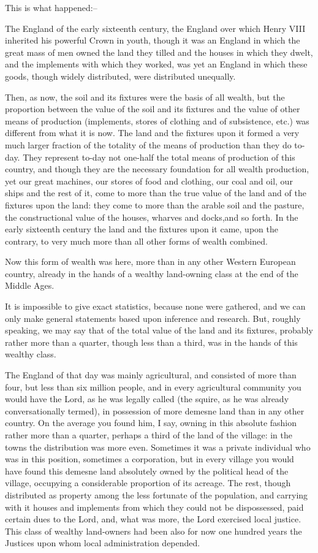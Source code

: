 \documentclass{book}
\begin{document}
This is what happened:–

The England of the early sixteenth century, the England over which Henry VIII inherited his powerful Crown in youth, though it was an England in which the great mass of men owned the land they tilled and the houses in which they dwelt, and the implements with which they worked, was yet an England in which these goods, though widely distributed, were distributed unequally.

Then, as now, the soil and its fixtures were the basis of all wealth, but the proportion between the value of the soil and its fixtures and the value of other means of production (implements, stores of clothing and of subsistence, etc.) was different from what it is now. The land and the fixtures upon it formed a very much larger fraction of the totality of the means of production than they do to-day. They represent to-day not one-half the total means of production of this country, and though they are the necessary foundation for all wealth production, yet our great machines, our stores of food and clothing, our coal and oil, our ships and the rest of it, come to more than the true value of the land and of the fixtures upon the land: they come to more than the arable soil and the pasture, the constructional value of the houses, wharves and docks,and so forth. In the early sixteenth century the land and the fixtures upon it came, upon the contrary, to very much more than all other forms of wealth combined.

Now this form of wealth was here, more than in any other Western European country, already in the hands of a wealthy land-owning class at the end of the Middle Ages.

It is impossible to give exact statistics, because none were gathered, and we can only make general statements based upon inference and research. But, roughly speaking, we may say that of the total value of the land and its fixtures, probably rather more than a quarter, though less than a third, was in the hands of this wealthy class.

The England of that day was mainly agricultural, and consisted of more than four, but less than six million people, and in every agricultural community you would have the Lord, as he was legally called (the squire, as he was already conversationally termed), in possession of more demesne land than in any other country. On the average you found him, I say, owning in this absolute fashion rather more than a quarter, perhaps a third of the land of the village: in the towns the distribution was more even. Sometimes it was a private individual who was in this position, sometimes a corporation, but in every village you would have found this demesne land absolutely owned by the political head of the village, occupying a considerable proportion of its acreage. The rest, though distributed as property among the less fortunate of the population, and carrying with it houses and implements from which they could not be dispossessed, paid certain dues to the Lord, and, what was more, the Lord exercised local justice. This class of wealthy land-owners had been also for now one hundred years the Justices upon whom local administration depended.
\end{document}
